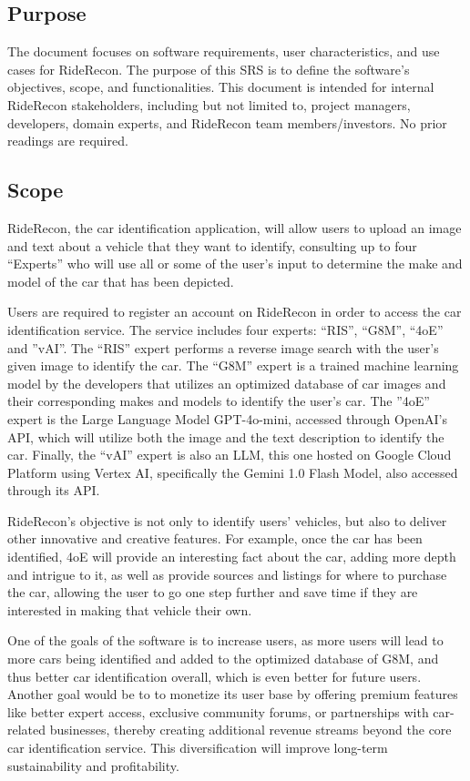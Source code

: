 \documentclass[]{article}
\begin{document}
\subsection{Purpose}
\label{sub:purpose}
The document focuses on software requirements, user characteristics, and use cases for RideRecon.
The purpose of this SRS is to define the software’s objectives, scope, and functionalities. This document is intended for internal RideRecon stakeholders, including but not limited to, project managers, developers, domain experts, and RideRecon team members/investors. No prior readings are required.

\subsection{Scope}
\label{sub:scope}

RideRecon, the car identification application, will allow users to upload an image and text about a vehicle that they want to identify, consulting up to four “Experts” who will use all or some of the user’s input to determine the make and model of the car that has been depicted.

Users are required to register an account on RideRecon in order to access the car identification service. The service includes four experts: “RIS”, “G8M”, “4oE” and ”vAI”. The “RIS” expert performs a reverse image search with the user’s given image to identify the car. The “G8M” expert is a trained machine learning model by the developers that utilizes an optimized database of car images and their corresponding makes and models to identify the user’s car. The ”4oE” expert is the Large Language Model GPT-4o-mini, accessed through OpenAI’s API, which will utilize both the image and the text description to identify the car. Finally, the “vAI” expert is also an LLM, this one hosted on Google Cloud Platform using Vertex AI, specifically the Gemini 1.0 Flash Model, also accessed through its API.

RideRecon’s objective is not only to identify users’ vehicles, but also to deliver other innovative and creative features. For example, once the car has been identified, 4oE will provide an interesting fact about the car, adding more depth and intrigue to it, as well as provide sources and listings for where to purchase the car, allowing the user to go one step further and save time if they are interested in making that vehicle their own.

One of the goals of the software is to increase users, as more users will lead to more cars being identified and added to the optimized database of G8M, and thus better car identification overall, which is even better for future users. Another goal would be to to monetize its user base by offering premium features like better expert access, exclusive community forums, or partnerships with car-related businesses, thereby creating additional revenue streams beyond the core car identification service. This diversification will improve long-term sustainability and profitability.
\end{document}
